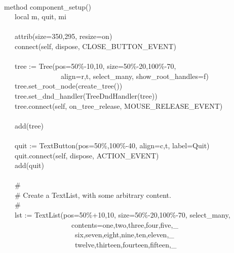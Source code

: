 {\ \\
\>   method component\_setup() \\
\>   \ \ \ local m, quit, mi \\
\ \\
\>   \ \ \ attrib({\textquotedbl}size=350,295{\textquotedbl},
{\textquotedbl}resize=on{\textquotedbl}) \\
\>   \ \ \ connect(self, {\textquotedbl}dispose{\textquotedbl},
CLOSE\_BUTTON\_EVENT) \\
\ \\
\>   \ \ \ tree := Tree({\textquotedbl}pos=50\%-10,10{\textquotedbl},
{\textquotedbl}size=50\%-20,100\%-70{\textquotedbl}, \\
\>   \ \ \ \ \ \ \ \ \ \ \ \ \ \ \ \ {\textquotedbl}align=r,t{\textquotedbl},
{\textquotedbl}select\_many{\textquotedbl},
{\textquotedbl}show\_root\_handles=f{\textquotedbl}) \\
\>   \ \ \ tree.set\_root\_node(create\_tree()) \\
\>   \ \ \ tree.set\_dnd\_handler(TreeDndHandler(tree)) \\
\>   \ \ \ tree.connect(self,
{\textquotedbl}on\_tree\_release{\textquotedbl},
MOUSE\_RELEASE\_EVENT) \\
\ \\
\>   \ \ \ add(tree) \\
\ \\
\>   \ \ \ quit :=
TextButton({\textquotedbl}pos=50\%,100\%-40{\textquotedbl},
{\textquotedbl}align=c,t{\textquotedbl},
{\textquotedbl}label=Quit{\textquotedbl}) \\
\>   \ \ \ quit.connect(self, {\textquotedbl}dispose{\textquotedbl},
ACTION\_EVENT) \\
\>   \ \ \ add(quit) \\
\ \\
\>   \ \ \ \# \\
\>   \ \ \ \# Create a TextList, with some arbitrary content. \\
\>   \ \ \ \# \\
\>   \ \ \ lst :=
TextList({\textquotedbl}pos=50\%+10,10{\textquotedbl},
{\textquotedbl}size=50\%-20,100\%-70{\textquotedbl},
{\textquotedbl}select\_many{\textquotedbl}, \\
\>   \ \ \ \ \ \ \ \ \ \ \ \ \ \ \ \ \ \ \ {\textquotedbl}contents=one,two,three,four,five,\_ \\
\>   \ \ \ \ \ \ \ \ \ \ \ \ \ \ \ \ \ \ \ \ six,seven,eight,nine,ten,eleven,\_ \\
\>   \ \ \ \ \ \ \ \ \ \ \ \ \ \ \ \ \ \ \ \ twelve,thirteen,fourteen,fifteen,\_ \\
}
